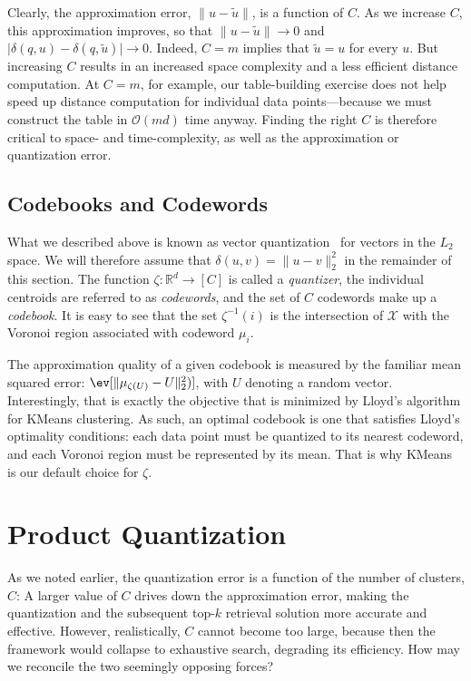 Clearly, the approximation error, $\lVert u - \tilde{u} \rVert$, is a function of $C$.
As we increase $C$, this approximation improves, so that $\lVert u - \tilde{u} \rVert \rightarrow 0$
and $\lvert \delta(q, u) - \delta(q, \tilde{u}) \rvert \rightarrow 0$.
Indeed, $C = m$ implies that $\tilde{u}=u$ for every $u$.
But increasing $C$ results in an increased space complexity and a less efficient distance computation.
At $C = m$, for example, our table-building exercise does not help speed up
distance computation for individual data points---because we
must construct the table in $\mathcal{O}(md)$ time anyway.
Finding the right $C$ is therefore critical
to space- and time-complexity, as well as the approximation or quantization error.

\subsection{Codebooks and Codewords}
What we described above is known as vector quantization~\citep{Gray1998Quantization}
for vectors in the $L_2$ space. We will therefore assume that $\delta(u, v) = \lVert u - v \rVert_2^2$
in the remainder of this section.
The function $\zeta: \mathbb{R}^d \rightarrow [C]$ is called a \emph{quantizer},
the individual centroids are referred to as \emph{codewords}, and the set of $C$
codewords make up a \emph{codebook}. It is easy to see that the set $\zeta^{-1}(i)$
is the intersection of $\mathcal{X}$ with the Voronoi region associated with codeword $\mu_i$.

The approximation quality of a given codebook is measured by the familiar mean squared error:
$\ev [\lVert \mu_{\zeta(U)} - U \rVert^2_2)]$, with $U$ denoting a random vector.
Interestingly, that is exactly the objective
that is minimized by Lloyd's algorithm for KMeans clustering. As such, an optimal codebook
is one that satisfies Lloyd's optimality conditions: each data point must be quantized to its
nearest codeword, and each Voronoi region must be represented by its mean. That is why
KMeans is our default choice for $\zeta$.

\section{Product Quantization}

As we noted earlier, the quantization error is a function of the number of clusters, $C$:
A larger value of $C$ drives down the approximation error, making the quantization
and the subsequent top-$k$ retrieval solution more accurate and effective.
However, realistically, $C$ cannot become too large, because then the framework
would collapse to exhaustive search, degrading its efficiency.
How may we reconcile the two seemingly opposing forces?

